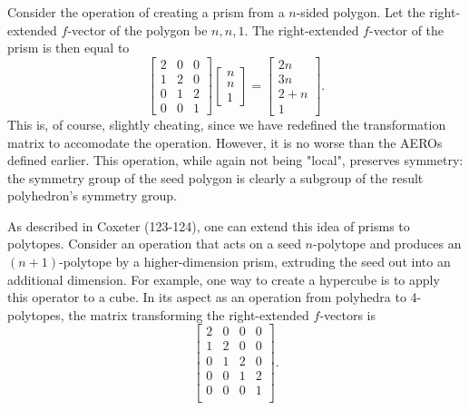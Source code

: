 \documentclass[12pt]{amsart}%
\begin{document}
Consider the operation of creating a prism from a $n$-sided polygon. Let the
right-extended $f$-vector of the polygon be $n, n, 1$. The right-extended
$f$-vector of the prism is then equal to
\begin{equation}
  \begin{bmatrix}
  2 & 0 & 0 \\
  1 & 2 & 0 \\
  0 & 1 & 2 \\
  0 & 0 & 1 \end{bmatrix}
  \begin{bmatrix} n \\  n \\ 1 \end{bmatrix}
  = \begin{bmatrix} 2n \\ 3n \\ 2+n \\ 1 \end{bmatrix}.
\end{equation}
This is, of course, slightly cheating, since we have redefined the
transformation matrix to accomodate the operation. However, it is no worse than
the AEROs defined earlier. This operation, while again not being "local",
preserves symmetry: the symmetry group of the seed polygon is clearly a
subgroup of the result polyhedron's symmetry group.

As described in Coxeter (123-124)\cite{coxeter73}, one can extend this idea of
prisms to polytopes. Consider an operation that acts on a seed $n$-polytope and
produces an $(n+1)$-polytope by a higher-dimension prism, extruding the seed out
into an additional dimension. For example, one way to create a hypercube is to
apply this operator to a cube. In its aspect as an operation from polyhedra to
4-polytopes, the matrix transforming the right-extended $f$-vectors is
\begin{equation}
  \begin{bmatrix}
  2 & 0 & 0 & 0 \\
  1 & 2 & 0 & 0 \\
  0 & 1 & 2 & 0 \\
  0 & 0 & 1 & 2 \\
  0 & 0 & 0 & 1 \\
  \end{bmatrix}.
\end{equation}


\end{document}
